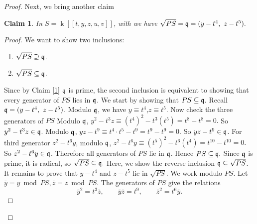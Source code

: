 \documentclass[10pt,a4paper]{amsart}
\newtheorem{claim}[theorem]{Claim}
\theoremstyle{definition}
\theoremstyle{remark}
\newcommand{\kk}{\operatorname{k}}
\newcommand{\q}{\frak{q}}
\begin{document}
\begin{proof}
	
	
	
	
	
	
	
	
	
	
Next, we bring another claim
\begin{claim}
	In \(S=\kk[[t,y,z,u,v]]\), with
	we have
	\(
	\sqrt{PS}=\q=(y-t^4,\ z-t^5).
	\)
\end{claim}

\begin{proof}
	We want to show two inclusions:
	\begin{enumerate}
		\item[(1)] \(\sqrt{PS}\supseteq \q\).
		\item[(2)] \(\sqrt{PS}\subseteq \q\).
	\end{enumerate}
	
	Since by Claim \ref{1} \(\q\) is prime, the second inclusion is equivalent to showing
	that every generator of \(PS\) lies in \(\q\).
	 We start by showing that \(PS\subseteq \q\).
	Recall
	\(
	\q=(y-t^4,\ z-t^5).
	\)
	Modulo \(\q\), we have
	\(
	y\equiv t^4\),\(z\equiv t^5.
	\)
	Now check the three generators of \(PS\)
	Modulo \(\q\),
	\(
	y^2-t^3z \equiv (t^4)^2-t^3(t^5)=t^8-t^8=0.
	\)
	So \(y^2-t^3z\in \q\).
	Modulo \(\q\),
	\(
	yz-t^9 \equiv t^4\cdot t^5-t^9=t^9-t^9=0.
	\)
	So \(yz-t^9\in \q\).
For third generator  \(z^2-t^6y\), 
modulo \(\q\),
	\(
	z^2-t^6y \equiv (t^5)^2-t^6(t^4)=t^{10}-t^{10}=0.
	\)
	So \(z^2-t^6y\in \q\).
Therefore all generators of \(PS\) lie in \(\q\). Hence
	\(
	PS\subseteq \q.
	\)
	Since \(\q\) is prime, it is radical, so
	\(
	\sqrt{PS}\subseteq \q.
	\)
Here, we show the reverse inclusion \(\q\subseteq \sqrt{PS}\).
	It remains to prove that \(y-t^4\) and \(z-t^5\) lie in \(\sqrt{PS}\).
	We work modulo \(PS\). Let
	\(
	\bar y=y \bmod PS,  \bar z=z \bmod PS.
	\)
	The generators of \(PS\) give the relations
	\[
	\bar y^2=t^3\bar z,\qquad \bar y\bar z=t^9,\qquad
	\bar z^2=t^6\bar y.
	\]
	

\end{proof}
\end{proof}
\end{document}
